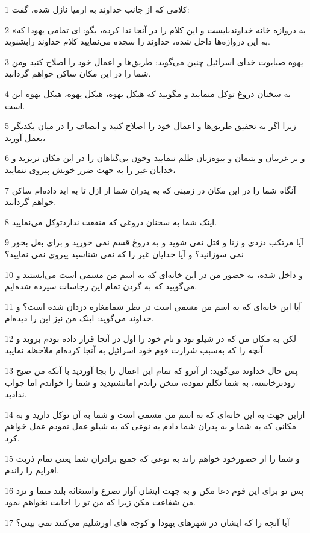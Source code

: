 \par 1 کلامی که از جانب خداوند به ارمیا نازل شده، گفت:
\par 2 «به دروازه خانه خداوندبایست و این کلام را در آنجا ندا کرده، بگو: ای تمامی یهودا که به این دروازه‌ها داخل شده، خداوند را سجده می‌نمایید کلام خداوند رابشنوید.
\par 3 یهوه صبایوت خدای اسرائیل چنین می‌گوید: طریق‌ها و اعمال خود را اصلاح کنید ومن شما را در این مکان ساکن خواهم گردانید.
\par 4 به سخنان دروغ توکل منمایید و مگویید که هیکل یهوه، هیکل یهوه، هیکل یهوه این است.
\par 5 زیرا اگر به تحقیق طریق‌ها و اعمال خود را اصلاح کنید و انصاف را در میان یکدیگر بعمل آورید،
\par 6 و بر غریبان و یتیمان و بیوه‌زنان ظلم ننمایید وخون بی‌گناهان را در این مکان نریزید و خدایان غیر را به جهت ضرر خویش پیروی ننمایید،
\par 7 آنگاه شما را در این مکان در زمینی که به پدران شما از ازل تا به ابد داده‌ام ساکن خواهم گردانید.
\par 8 اینک شما به سخنان دروغی که منفعت نداردتوکل می‌نمایید.
\par 9 آیا مرتکب دزدی و زنا و قتل نمی شوید و به دروغ قسم نمی خورید و برای بعل بخور نمی سوزانید؟ و آیا خدایان غیر را که نمی شناسید پیروی نمی نمایید؟
\par 10 و داخل شده، به حضور من در این خانه‌ای که به اسم من مسمی است می‌ایستید و می‌گویید که به گردن تمام این رجاسات سپرده شده‌ایم.
\par 11 آیا این خانه‌ای که به اسم من مسمی است در نظر شمامغاره دزدان شده است؟ و خداوند می‌گوید: اینک من نیز این را دیده‌ام.
\par 12 لکن به مکان من که در شیلو بود و نام خود را اول در آنجا قرار داده بودم بروید و آنچه را که به‌سبب شرارت قوم خود اسرائیل به آنجا کرده‌ام ملاحظه نمایید.
\par 13 پس حال خداوند می‌گوید: از آنرو که تمام این اعمال را بجا آوردید با آنکه من صبح زودبرخاسته، به شما تکلم نموده، سخن راندم امانشنیدید و شما را خواندم اما جواب ندادید.
\par 14 ازاین جهت به این خانه‌ای که به اسم من مسمی است و شما به آن توکل دارید و به مکانی که به شما و به پدران شما دادم به نوعی که به شیلو عمل نمودم عمل خواهم کرد.
\par 15 و شما را از حضورخود خواهم راند به نوعی که جمیع برادران شما یعنی تمام ذریت افرایم را راندم.
\par 16 پس تو برای این قوم دعا مکن و به جهت ایشان آواز تضرع واستغاثه بلند منما و نزد من شفاعت مکن زیرا که من تو را اجابت نخواهم نمود.
\par 17 آیا آنچه را که ایشان در شهرهای یهودا و کوچه های اورشلیم می‌کنند نمی بینی؟
